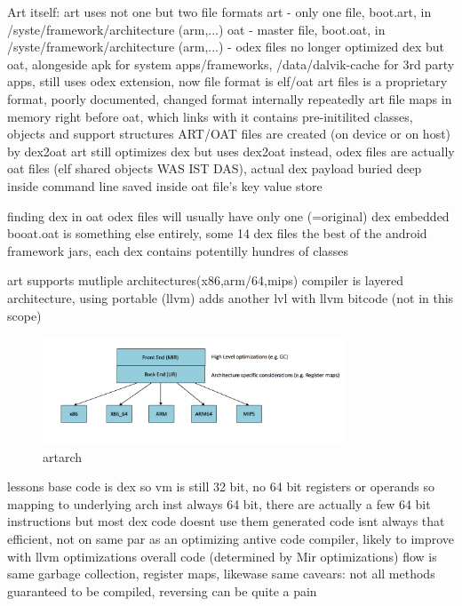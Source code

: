 Art itself:
art uses not one but two file formats
art - only one file, boot.art, in /syste/framework/architecture (arm,...)
oat - master file, boot.oat, in /syste/framework/architecture (arm,...) - odex files no longer optimized dex but oat, alongeside apk for system apps/frameworks, /data/dalvik-cache for 3rd party apps, still uses odex extension, now file format is elf/oat\newline
art files is a proprietary format, poorly documented, changed format internally repeatedly
art file maps in memory right before oat, which links with it
contains pre-initilited classes, objects and support structures\newline
ART/OAT files are created (on device or on host) by dex2oat
art still optimizes dex but uses dex2oat instead, odex files are actually oat files (elf shared objects WAS IST DAS), actual dex payload buried deep inside
command line saved inside oat file's key value store


finding dex in oat
odex files will usually have only one (=original) dex embedded
booat.oat is something else entirely, some 14 dex files the best of the android framework jars, each dex contains potentilly hundres of classes

art supports mutliple architectures(x86,arm/64,mips)
compiler is layered architecture, using portable (llvm) adds another lvl with llvm bitcode (not in this scope)
\begin{figure}[h]
    \centering
    \includegraphics[width=0.8\textwidth]{data/artarch.png}
    \caption{artarch}
    \label{fig:artarch}
\end{figure}



lessons
base code is dex so vm is still 32 bit, no 64 bit registers or operands so mapping to underlying arch inst always 64 bit, there are actually a few 64 bit instructions but most dex code doesnt use them
generated code isnt always that efficient, not on same par as an optimizing antive code compiler, likely to improve with llvm optimizations
overall code (determined by Mir optimizations) flow is same
garbage collection, register maps, likewase same
cavears: not all methods guaranteed to be compiled, reversing can be quite a pain
\newline


